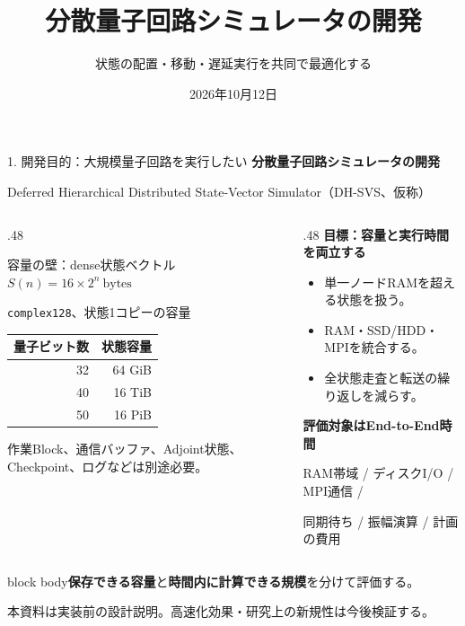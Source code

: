 \documentclass[aspectratio=169,10pt,hyperref={unicode,hidelinks}]{beamer}
\title{分散量子回路シミュレータの開発}
\subtitle{状態の配置・移動・遅延実行を共同で最適化する}
\date{2026年10月12日}
\newcommand{\takeaway}[1]{\par\vspace{2mm}\begin{beamercolorbox}[wd=\textwidth,sep=1.5mm]{block body}\small #1\end{beamercolorbox}\par}
\newcommand{\smallnote}[1]{\par{\footnotesize\color{muted}#1\par}}
\begin{document}
\begin{frame}{1. 開発目的：大規模量子回路を実行したい}
  {\large\bfseries 分散量子回路シミュレータの開発}\par
  \smallnote{Deferred Hierarchical Distributed State-Vector Simulator（DH-SVS、仮称）}
  \begin{columns}[T,onlytextwidth]
    \begin{column}{.48\textwidth}
      \begin{block}{容量の壁：dense状態ベクトル}
        \centering $S(n)=16\times 2^n\ \mathrm{bytes}$\par
        \small\texttt{complex128}、状態1コピーの容量\par
        \medskip
        \begin{tabular}{rr}
          \toprule 量子ビット数 & 状態容量 \\
          \midrule 32 & 64 GiB \\40 & 16 TiB \\50 & 16 PiB \\
          \bottomrule
        \end{tabular}
      \end{block}
      \smallnote{作業Block、通信バッファ、Adjoint状態、Checkpoint、ログなどは別途必要。}
    \end{column}
    \begin{column}{.48\textwidth}
      \textbf{目標：容量と実行時間を両立する}
      \begin{itemize}
        \item 単一ノードRAMを超える状態を扱う。
        \item RAM・SSD/HDD・MPIを統合する。
        \item 全状態走査と転送の繰り返しを減らす。
      \end{itemize}
      \medskip
      \textbf{評価対象はEnd-to-End時間}\par
      \small RAM帯域 / ディスクI/O / MPI通信 /\par
      同期待ち / 振幅演算 / 計画の費用
    \end{column}
  \end{columns}
  \takeaway{\textbf{保存できる容量}と\textbf{時間内に計算できる規模}を分けて評価する。}
  \smallnote{本資料は実装前の設計説明。高速化効果・研究上の新規性は今後検証する。}
\end{frame}
\end{document}
